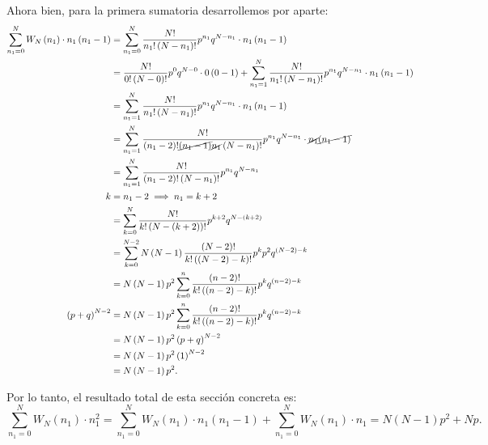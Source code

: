 \documentclass{report}
\begin{document}
\begin{enumerate}
    Ahora bien, para la primera sumatoria desarrollemos por aparte:
    \begin{align*}
      \sum_{n_1 = 0}^{N} W_N\left( n_1 \right) \cdot n_1\left( n_1 - 1 \right)  &= \sum_{n_1 = 0}^{N} \frac{N!}{n_1!\left( N - n_1 \right)!}p^{n_1}q^{N - n_1}\cdot n_1\left( n_1 - 1 \right)  \\
      &=  \frac{N!}{0!\left( N - 0 \right)!}p^{0}q^{N - 0}\cdot 0\left( 0 - 1 \right) + \sum_{n_1 = 1}^{N} \frac{N!}{n_1!\left( N - n_1 \right)!}p^{n_1}q^{N - n_1}\cdot n_1\left( n_1 - 1 \right)\\
      &= \sum_{n_1 = 1}^{N} \frac{N!}{n_1!\left( N - n_1 \right)!}p^{n_1}q^{N - n_1}\cdot n_1\left( n_1 - 1 \right) \\
      &= \sum_{n_1 = 1}^{N} \frac{N!}{\left( n_1 - 2 \right) !\cancel{\left( n_1 - 1 \right) }\cancel{n_1}\left( N - n_1 \right)!}p^{n_1}q^{N - n_1}\cdot \cancel{n_1}\cancel{\left( n_1 - 1 \right)} \\
      &= \sum_{n_1 = 1}^{N} \frac{N!}{\left( n_1 - 2 \right)! \left( N - n_1 \right)!}p^{n_1}q^{N - n_1} \\
      k &= n_1 - 2 \implies n_1 = k + 2 \\
      &= \sum_{k = 0}^{N} \frac{N!}{k! \left( N - \left( k + 2 \right)  \right)!}p^{k + 2}q^{N - \left( k + 2 \right) } \\
      &= \sum_{k = 0}^{N - 2} N\left( N - 1 \right) \frac{\left( N - 2 \right) !}{k! \left( \left( N - 2 \right)  - k  \right)!}p^{k}p^2q^{\left( N - 2 \right) - k } \\
      &= N\left( N - 1 \right) p^2 \sum_{k=0}^{n} \frac{\left( n - 2 \right)!}{k! \left( \left( n - 2 \right) - k \right)!}p^{k}q^{\left( n - 2 \right) - k}\\
      \left( p + q \right)^{N - 2} &= N\left( N - 1 \right) p^2 \sum_{k=0}^{n} \frac{\left( n - 2 \right)!}{k! \left( \left( n - 2 \right) - k \right)!}p^{k}q^{\left( n - 2 \right) - k}\\
      &= N\left( N - 1 \right)p^2 \left( p + q \right)^{N - 2} \\
      &= N\left( N -1 \right)p^{2} \left( 1 \right)^{N - 2} \\
      &= N\left( N - 1 \right)p^2
    .\end{align*}

    Por lo tanto, el resultado total de esta sección concreta es: \[
      \sum_{n_1 = 0}^{N} W_N\left( n_1 \right) \cdot n_1^2 = \sum_{n_1 = 0}^{N} W_N\left( n_1 \right) \cdot n_1\left( n_1 - 1\right) + \sum_{n_1 = 0}^{N} W_N\left( n_1 \right) \cdot n_1 = N\left( N - 1 \right)p^2 + Np
    .\] 


\end{enumerate}
\end{document}
